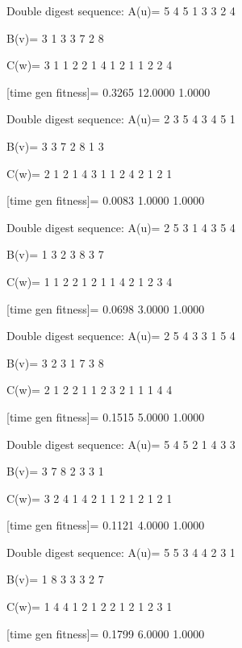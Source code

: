 Double digest sequence:
A(u)=
     5     4     5     1     3     3     2     4

B(v)=
     3     1     3     3     7     2     8

C(w)=
     3     1     1     2     2     1     4     1     2     1     1     2     2     4

[time gen fitness]=
    0.3265   12.0000    1.0000

Double digest sequence:
A(u)=
     2     3     5     4     3     4     5     1

B(v)=
     3     3     7     2     8     1     3

C(w)=
     2     1     2     1     4     3     1     1     2     4     2     1     2     1

[time gen fitness]=
    0.0083    1.0000    1.0000

Double digest sequence:
A(u)=
     2     5     3     1     4     3     5     4

B(v)=
     1     3     2     3     8     3     7

C(w)=
     1     1     2     2     1     2     1     1     4     2     1     2     3     4

[time gen fitness]=
    0.0698    3.0000    1.0000

Double digest sequence:
A(u)=
     2     5     4     3     3     1     5     4

B(v)=
     3     2     3     1     7     3     8

C(w)=
     2     1     2     2     1     1     2     3     2     1     1     1     4     4

[time gen fitness]=
    0.1515    5.0000    1.0000

Double digest sequence:
A(u)=
     5     4     5     2     1     4     3     3

B(v)=
     3     7     8     2     3     3     1

C(w)=
     3     2     4     1     4     2     1     1     2     1     2     1     2     1

[time gen fitness]=
    0.1121    4.0000    1.0000

Double digest sequence:
A(u)=
     5     5     3     4     4     2     3     1

B(v)=
     1     8     3     3     3     2     7

C(w)=
     1     4     4     1     2     1     2     2     1     2     1     2     3     1

[time gen fitness]=
    0.1799    6.0000    1.0000

